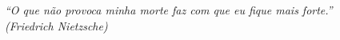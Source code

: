 \begin{epigrafe}
    \vspace*{\fill}
	\begin{flushright}
		\textit{``O que não provoca minha morte faz com que eu fique mais forte.''\\
		          (Friedrich Nietzsche)\\
  }
	\end{flushright}
\end{epigrafe}
